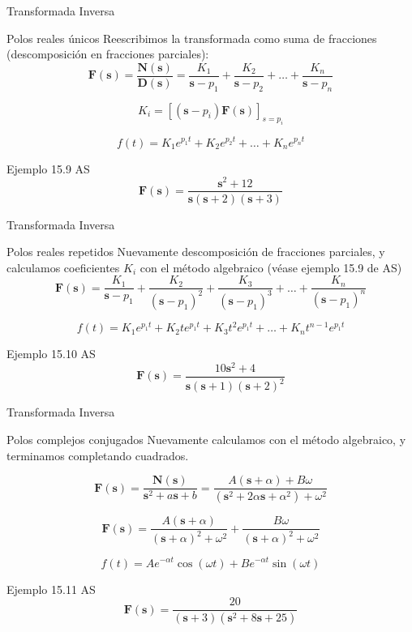 \documentclass[aspectratio=169, usenames,svgnames,dvipsnames]{beamer}
\newcommand{\laplace}[1]{\mathbf{#1}(\mathbf{s})}
\newcommand{\slp}{\mathbf{s}}
\begin{document}
\begin{frame}[label={sec:orgb0ac888}]{Transformada Inversa}
\begin{block}{Polos reales únicos}
Reescribimos la transformada como suma de fracciones (descomposición en fracciones parciales):
\[
  \laplace{F} = \frac{\laplace{N}}{\laplace{D}} = \frac{K_1}{\slp-p_1} + \frac{K_2}{\slp-p_2} + \ldots + \frac{K_n}{\slp-p_n} 
\]

\[
  K_i = \left[(\slp - p_i) \laplace{F}\right]_{s = p_i}
\]

\[
  f(t) = K_1 e^{p_1 t} + K_2 e^{p_2 t} + \ldots + K_n e^{p_n t}
\]
\end{block}

\begin{block}{Ejemplo 15.9 AS}
\[
  \laplace{F} = \frac{\slp^2 + 12}{\slp(\slp + 2)(\slp + 3)}
\]
\end{block}
\end{frame}


\begin{frame}[label={sec:org3e8c73b}]{Transformada Inversa}
\begin{block}{Polos reales repetidos}
Nuevamente descomposición de fracciones parciales, y calculamos coeficientes \(K_i\) con el método algebraico (véase ejemplo 15.9 de AS)
\[
  \laplace{F} = \frac{K_1}{\slp-p_1} + \frac{K_2}{(\slp-p_1)^2} + \frac{K_3}{(\slp-p_1)^3} + \ldots + \frac{K_n}{(\slp-p_1)^n} 
\]

\[
  f(t) = K_1 e^{p_1 t} + K_2 t e^{p_1 t} + K_3 t^2 e^{p_1 t} + \ldots + K_n t^{n-1} e^{p_1 t}
\]
\end{block}



\begin{block}{Ejemplo 15.10 AS}
\[
  \laplace{F} = \frac{10\slp^2 + 4}{\slp(\slp + 1)(\slp + 2)^2}
\]
\end{block}
\end{frame}


\begin{frame}[label={sec:org25b0717}]{Transformada Inversa}
\begin{block}{Polos complejos conjugados}
Nuevamente calculamos con el método algebraico, y terminamos \guillemotleft{}completando cuadrados\guillemotright{}.

\[
  \laplace{F} = \frac{\laplace{N}}{\slp^2 + a \slp + b} = \frac{A (\slp + \alpha) + B \omega}{(\slp^2 + 2\alpha \slp + \alpha^2) + \omega^2}
\]

\[
  \laplace{F} = \frac{A (\slp + \alpha)}{(\slp + \alpha)^2 + \omega^2} + \frac{B \omega}{(\slp + \alpha)^2 + \omega^2}
\]

\[
  f(t) = A e^{- \alpha t} \cos(\omega t) + B e^{- \alpha t} \sin(\omega t)
\]
\end{block}


\begin{block}{Ejemplo 15.11 AS}
\[
  \laplace{F} = \frac{20}{(\slp + 3)(\slp^2 + 8 \slp + 25)}
\]
\end{block}
\end{frame}
\end{document}
